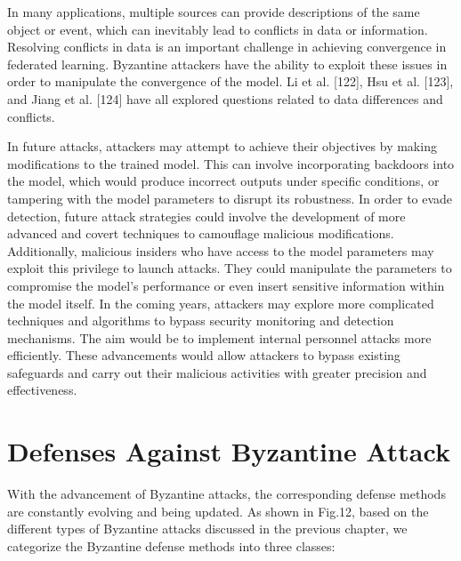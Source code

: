 In many applications, multiple sources can provide
descriptions of the same object or event, which can inevitably
lead to conflicts in data or information. Resolving conflicts
in data is an important challenge in achieving convergence
in federated learning. Byzantine attackers have the ability
to exploit these issues in order to manipulate the
convergence of the model. Li et al. [122], Hsu et al. [123], and
Jiang et al. [124] have all explored questions related to
data differences and conflicts. 

In future attacks, attackers may attempt to achieve their
objectives by making modifications to the trained model.
This can involve incorporating backdoors into the model,
which would produce incorrect outputs under specific
conditions, or tampering with the model parameters to
disrupt its robustness. In order to evade detection, future
attack strategies could involve the development of more
advanced and covert techniques to camouflage malicious
modifications. Additionally, malicious insiders who have
access to the model parameters may exploit this privilege
to launch attacks. They could manipulate the parameters
to compromise the model’s performance or even insert
sensitive information within the model itself. In the coming
years, attackers may explore more complicated techniques
and algorithms to bypass security monitoring and
detection mechanisms. The aim would be to implement internal
personnel attacks more eﬀiciently. These advancements
would allow attackers to bypass existing safeguards and
carry out their malicious activities with greater precision
and effectiveness.  

\section{Defenses Against Byzantine Attack}  
With the advancement of Byzantine attacks, the
corresponding defense methods are constantly evolving and
being updated. As shown in Fig.12, based on the different
types of Byzantine attacks discussed in the previous
chapter, we categorize the Byzantine defense methods into
three classes:  

